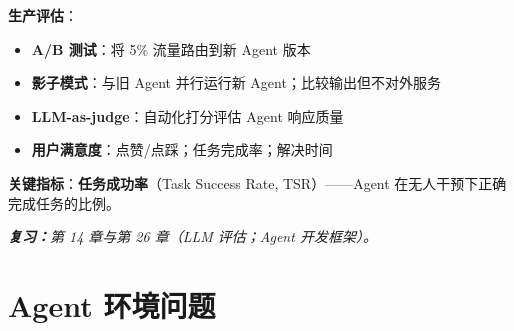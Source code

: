 \begin{questionbox}
\textbf{生产评估}：

\begin{itemize}
  \item \textbf{A/B 测试}：将 5\% 流量路由到新 Agent 版本
  \item \textbf{影子模式}：与旧 Agent 并行运行新 Agent；比较输出但不对外服务
  \item \textbf{LLM-as-judge}：自动化打分评估 Agent 响应质量
  \item \textbf{用户满意度}：点赞/点踩；任务完成率；解决时间
\end{itemize}

\textbf{关键指标}：\textbf{任务成功率}（Task Success Rate, TSR）——Agent 在无人干预下正确完成任务的比例。

\emph{\textbf{复习：}第 14 章与第 26 章（LLM 评估；Agent 开发框架）。}
\end{questionbox}

\section{Agent 环境问题}
\label{agentic-environments-questions}

